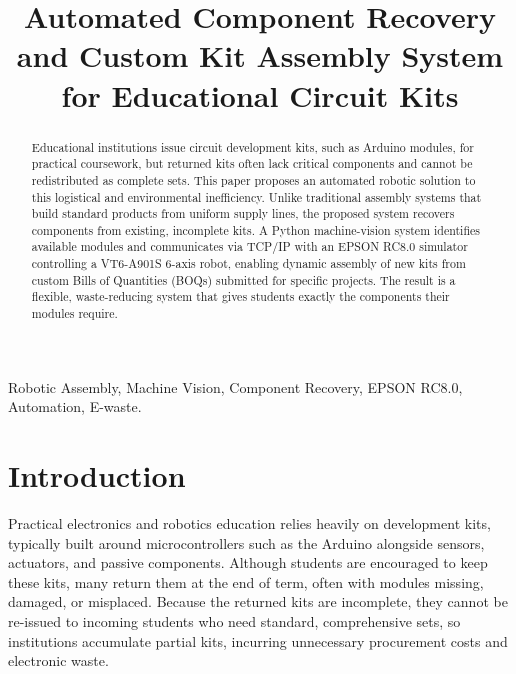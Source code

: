 \documentclass[conference]{IEEEtran}
\begin{document}
\title{Automated Component Recovery and Custom Kit Assembly System for Educational Circuit Kits}

\author{
\and
{}
\and
{}
}

\maketitle

\begin{abstract}
Educational institutions issue circuit development kits, such as Arduino modules, for practical coursework, but returned kits often lack critical components and cannot be redistributed as complete sets. This paper proposes an automated robotic solution to this logistical and environmental inefficiency. Unlike traditional assembly systems that build standard products from uniform supply lines, the proposed system recovers components from existing, incomplete kits. A Python machine-vision system identifies available modules and communicates via TCP/IP with an EPSON RC8.0 simulator controlling a VT6-A901S 6-axis robot, enabling dynamic assembly of new kits from custom Bills of Quantities (BOQs) submitted for specific projects. The result is a flexible, waste-reducing system that gives students exactly the components their modules require.
\end{abstract}

\begin{IEEEkeywords}
Robotic Assembly, Machine Vision, Component Recovery, EPSON RC8.0, Automation, E-waste.
\end{IEEEkeywords}

\section{Introduction}
Practical electronics and robotics education relies heavily on development kits, typically built around microcontrollers such as the Arduino alongside sensors, actuators, and passive components. Although students are encouraged to keep these kits, many return them at the end of term, often with modules missing, damaged, or misplaced. Because the returned kits are incomplete, they cannot be re-issued to incoming students who need standard, comprehensive sets, so institutions accumulate partial kits, incurring unnecessary procurement costs and electronic waste.
\end{document}
